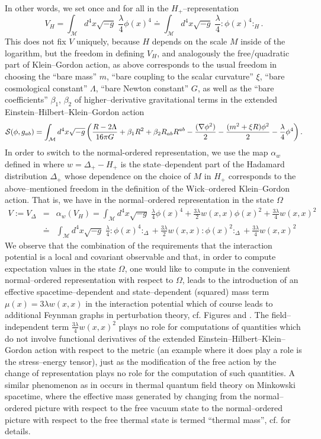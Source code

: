 \documentclass[10pt]{book}
\newcommand{\wick}[1]{:\!{#1}\!:}
\let\int\int
\newcommand{\Mcal}{\mathcal{M}}
\theoremstyle{break}
\begin{document}
In other words, we set once and for all in the $H_+$--representation 
$$
V_H=\int_\Mcal d^4x \sqrt{-g} \; \frac{\lambda}{4} \phi(x)^4\doteq \int_\Mcal d^4x \sqrt{-g} \; \frac{\lambda}{4} \wick{\phi(x)^4}_H.
$$
This does not fix $V$ uniquely, because $H$ depends on the scale $M$ inside of the logarithm, but the freedom in defining $V_H$, and analogously the free/quadratic part of Klein--Gordon action, as above corresponds to the usual freedom in choosing the ``bare mass'' $m$, ``bare coupling to the scalar curvature'' $\xi$, ``bare cosmological constant'' $\Lambda$, ``bare Newton constant'' $G$, as well as the ``bare coefficients'' $\beta_1$, $\beta_2$ of higher--derivative gravitational terms in the extended Einstein--Hilbert--Klein--Gordon action
$$
{\cal S}(\phi,g_{ab})=\int_\Mcal d^4x \sqrt{-g}\left(\frac{R-2\Lambda}{16 \pi G}+\beta_1 R^2 + \beta_2 R_{ab}R^{ab}-\frac{(\nabla \phi^2)}{2}-\frac{(m^2+\xi R )\phi^2}{2}-\frac{\lambda}{4}\phi^4\right).
$$
In order to switch to the normal-ordered representation, we use the map $\alpha_{w}$ defined in %
where $w=\Delta_+-H_+$ is the state--dependent part of the Hadamard distribution $\Delta_+$ whose dependence on the choice of $M$ in $H_+$ corresponds to the above--mentioned freedom in the definition of the Wick--ordered Klein--Gordon action. That is, we have in the normal--ordered representation in the state $\Omega$
\begin{eqnarray}
V:=V_\Delta&=&\alpha_w(V_H)=\int_\Mcal d^4x \sqrt{-g} \; \frac{\lambda}{4} \phi(x)^4 + \frac{3\lambda}{2}w(x,x)\phi(x)^2+\frac{3\lambda}{4} w(x,x)^2\\
&\doteq&\int_\Mcal d^4x \sqrt{-g} \; \frac{\lambda}{4} \wick{\phi(x)^4}_\Delta + \frac{3\lambda}{2}w(x,x)\wick{\phi(x)^2}_\Delta+\frac{3\lambda}{4} w(x,x)^2 
\end{eqnarray}
We observe that the combination of the requirements that the interaction potential is a local and covariant observable and that, in order to compute expectation values in the state $\Omega$, one would like to compute in the convenient normal--ordered representation with respect to $\Omega$, leads to the introduction of an effective spacetime--dependent and state--dependent (squared) mass term $\mu(x)=3\lambda w(x,x)$ in the interaction potential which of course leads to additional Feynman graphs in perturbation theory, cf. Figures %
and %
. The field--independent term $\frac{3\lambda}{4} w(x,x)^2$ plays no role for computations of quantities which do not involve functional derivatives of the extended Einstein--Hilbert--Klein--Gordon action with respect to the metric (an example where it does play a role is the stress--energy tensor), just as the modification of the free action by the change of representation plays no role for the computation of such quantities. A similar 
phenomenon as in %
occurs in thermal quantum field theory on Minkowski spacetime, where the effective mass generated by changing from the normal--ordered picture with respect to the free vacuum state to the normal--ordered picture with respect to the free thermal state is termed ``thermal mass'', cf. %
for details.
\end{document}
